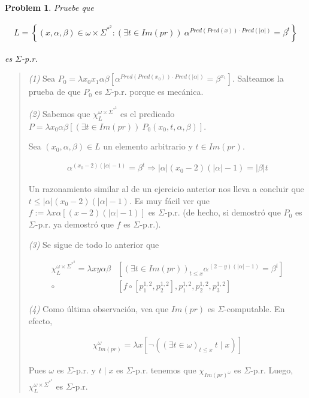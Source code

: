 \documentclass[a4paper, 12pt]{article}
\newtheorem{problem}{Problem}
\newtheorem{problem}{Problem}
\begin{document}
\begin{problem}
    Pruebe que 

    \begin{align*}
        L = \left\{ (x, \alpha, \beta) \in \omega \times \Sigma^{*}^2 : \left(
        \exists t \in Im(pr) \right) ~ \alpha^{Pred(Pred(x)) \cdot
    Pred(|\alpha|)} = \beta^t  \right\} 
    \end{align*}

    es $\Sigma$-p.r. 
\end{problem}


\small
\begin{quote}

    \textit{(1)} Sea $P_0 = \lambda x_0 x_1\alpha\beta \left[
    \alpha^{Pred(Pred(x_0))\cdot Pred(|\alpha|)} = \beta^{x_1}  \right]$. Salteamos la
    prueba de que $P_0$ es $\Sigma$-p.r. porque es mecánica.

    \textit{(2)} Sabemos que $\chi_{L}^{\omega \times  \Sigma^{*}^2}$ es el
    predicado $P = \lambda x_0 \alpha \beta \left[ (\exists t \in Im(pr)) ~
    P_0(x_0, t, \alpha, \beta)  \right]$. 

    Sea $(x_0, \alpha, \beta) \in L$ un elemento arbitrario y $t \in Im(pr)$.

    \begin{align*}
        \alpha^{(x_0 - 2)(|\alpha| - 1)} = \beta^{t} \Rightarrow |\alpha|(x_0 -
        2)(|\alpha| - 1) = |\beta| t
    \end{align*}

    Un razonamiento similar al de un ejercicio anterior nos lleva a concluir que
    $t \leq |\alpha|(x_0 - 2)(|\alpha| - 1)$. Es muy fácil ver que $f := \lambda
    x\alpha\left[  (x-2)(|\alpha| - 1)  \right]$ es $\Sigma$-p.r. (de hecho, si
    demostró que $P_0$ es $\Sigma$-p.r. ya demostró que $f$ es $\Sigma$-p.r.).

    \textit{(3)} Se sigue de todo lo anterior que 

    \begin{align*}
    \chi_L^{\omega\times \Sigma^{*}^2} = \lambda xy\alpha\beta &\left[ \left(
    \exists t \in Im(pr) \right)_{t\leq x} \alpha^{(2 - y)(|\alpha| - 1)} =
\beta^t   \right] \\ 
            \circ & \left[ f \circ \left[ p_1^{1, 2}, p_2^{1, 2} \right],
            p_1^{1, 2}, p_2^{1, 2}, p_3^{1, 2}   \right] 
    \end{align*}

\textit{(4)} Como última observación, vea que $Im(pr)$ es $\Sigma$-computable.
En efecto, 

\begin{align*}
    \chi_{Im(pr)}^{\omega} = \lambda x \left[ \neg \left(\left( \exists t \in \omega
    \right)_{t \leq x} ~ t \mid x \right)  \right]
\end{align*}

Pues $\omega$ es $\Sigma$-p.r. y $t \mid x$ es $\Sigma$-p.r. tenemos que
$\chi_{Im(pr)^{\omega}}$ es $\Sigma$-p.r. Luego, $\chi_{L}^{\omega \times
\Sigma^{*}^2}$ es $\Sigma$-p.r. 







\end{quote}
\normalsize
\end{document}
